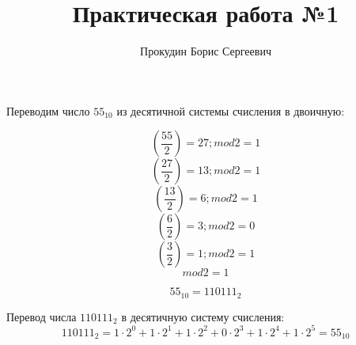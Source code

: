 \documentclass[a4paper,11pt]{article}
\title{Практическая работа №1}
\author{Прокудин Борис Сергеевич}
\begin{document}
\maketitle
Переводим число $55_{10}$ из десятичной системы счисления в двоичную:

$$\left(\frac{55}{2}\right)=27;
mod2=1$$
$$\left(\frac{27}{2}\right)=13;
mod2=1$$
$$\left(\frac{13}{2}\right)=6;
mod2=1$$
$$\left(\frac{6}{2}\right)=3;
mod2=0$$
$$\left(\frac{3}{2}\right)=1;
mod2=1$$
$$mod2=1$$

$$55_{10}=110111_2$$

Перевод числа $110111_2$ в десятичную систему счисления:
$$110111_2=1\cdot2^0+1\cdot2^1+1\cdot2^2+0\cdot2^3+1\cdot2^4+1\cdot2^5=55_{10}$$
\end{document}
